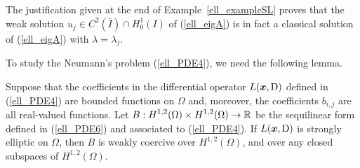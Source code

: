 \begin{egg}
The justification given at the end of Example~\ref{ell_exampleSL}
proves that the weak solution
$\displaystyle u_j \in C^2(\overline{I}) \cap H^1_0(I)$ of (\ref{ell_eigA}) is
in fact a classical solution of (\ref{ell_eigA}) with
$\lambda = \lambda_j$.
\end{egg}

To study the Neumann's problem (\ref{ell_PDE4}), we need the following lemma.

\begin{lemma} \label{ell_stell_coerc}
Suppose that the coefficients in the differential operator
$L({\bm{x}},\operatorname{D})$ defined in (\ref{ell_PDE4}) are bounded functions on
$\Omega$ and, moreover, the coefficients $b_{i,j}$ are all real-valued
functions.  Let
$\displaystyle B:H^{1,2}(\Omega)\times H^{1,2}(\Omega) \rightarrow \mathbb{R}$
be the sequilinear form defined in (\ref{ell_PDE6}) and associated to
(\ref{ell_PDE4}).  If $L({\bm{x}},\operatorname{D})$ is strongly elliptic on $\Omega$,
then $B$ is weakly coercive over $\displaystyle H^{1,2}(\Omega)$, and
over any closed subspaces of $\displaystyle H^{1,2}(\Omega)$.
\end{lemma}

